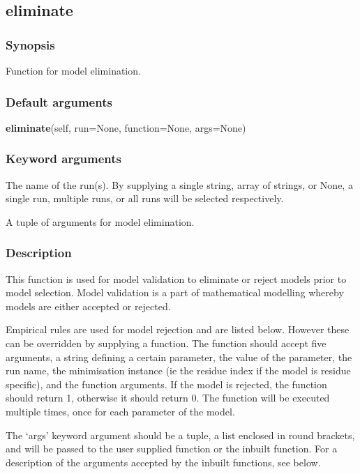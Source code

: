 \newpage

\subsection{eliminate}


\subsubsection{Synopsis}

Function for model elimination.

\subsubsection{Default arguments}

\textsf{\textbf{eliminate}(self, run=None, function=None, args=None)}


\subsubsection{Keyword arguments}

  The name of the run(s).  By supplying a single string, array of strings, or None, a single run, multiple runs, or all runs will be selected respectively.

  A tuple of arguments for model elimination.

\subsubsection{Description}

This function is used for model validation to eliminate or reject models prior to model
selection.  Model validation is a part of mathematical modelling whereby models are either
accepted or rejected.

Empirical rules are used for model rejection and are listed below.  However these can be
overridden by supplying a function.  The function should accept five arguments, a string
defining a certain parameter, the value of the parameter, the run name, the minimisation
instance (ie the residue index if the model is residue specific), and the function
arguments.  If the model is rejected, the function should return 1, otherwise it should
return 0.  The function will be executed multiple times, once for each parameter of the
model.

The `args' keyword argument should be a tuple, a list enclosed in round brackets, and will
be passed to the user supplied function or the inbuilt function.  For a description of the
arguments accepted by the inbuilt functions, see below.


